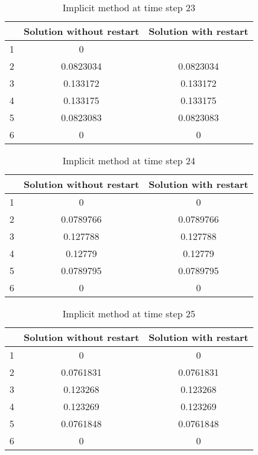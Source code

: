 \documentclass[a4paper,12pt]{article}
\begin{document}
\begin{table}[H]
\begin{center}
\begin{tabular}{ | c | c | c | }
  \hline
  & Solution without restart & Solution with restart \\
 \hline
 1  &  0 &    \\
  \hline
 2  &  0.0823034 &0.0823034    \\
  \hline
 3  &  0.133172 &  0.133172  \\
  \hline
 4  &  0.133175 & 0.133175   \\
  \hline
 5  &   0.0823083 & 0.0823083   \\
  \hline
 6  &   0 &  0  \\
  \hline
\end{tabular}
\end{center}
\caption{Implicit method at time step 23}
\end{table}

\begin{table}[H]
\begin{center}
\begin{tabular}{ | c | c | c | }
  \hline
  & Solution without restart & Solution with restart \\
 \hline
 1  &  0 & 0   \\
  \hline
 2  &  0.0789766 & 0.0789766   \\
  \hline
 3  &  0.127788 & 0.127788   \\
  \hline
 4  &  0.12779 &  0.12779  \\
  \hline
 5  &   0.0789795 & 0.0789795   \\
  \hline
 6  &   0 &  0  \\
  \hline
\end{tabular}
\end{center}
\caption{Implicit method at time step 24}
\end{table}

\begin{table}[H]
\begin{center}
\begin{tabular}{ | c | c | c | }
  \hline
  & Solution without restart & Solution with restart \\
 \hline
 1  &  0 &  0  \\
  \hline
 2  &  0.0761831 & 0.0761831   \\
  \hline
 3  &  0.123268 & 0.123268   \\
  \hline
 4  &  0.123269 & 0.123269   \\
  \hline
 5  &   0.0761848 & 0.0761848   \\
  \hline
 6  &   0 &  0  \\
  \hline
\end{tabular}
\end{center}
\caption{Implicit method at time step 25}
\end{table}
\end{document}
